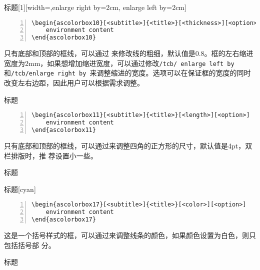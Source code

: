 \begin{ascolorbox10}[子标题]{标题}[1][width=\linewidth-4cm,enlarge right by=2cm, enlarge left by=2cm]
    \zhlipsum[1]
\end{ascolorbox10}
\begin{lstlisting}[backgroundcolor=\color{gray!5},framerule=1pt,frame=tb,numbers=left,
    numberstyle=\tiny\color{black},]
\begin{ascolorbox10}[<subtitle>]{<title>}[<thickness>][<option>]
    environment content
\end{ascolorbox10}
\end{lstlisting}
只有底部和顶部的框线，可以通过\md{[⟨thickness⟩]} 来修改线的粗细，默认值是0.8。框的左右缩进宽度为2mm，如果想增加缩进宽度，可以通过修改\texttt{/tcb/ enlarge left by }和\texttt{/tcb/enlarge
right by }来调整缩进的宽度。选项可以在保证框的宽度的同时改变左右边距，因此用户可以根据需求调整。


\begin{ascolorbox11}[子标题]{标题}
    \zhlipsum[1]
\end{ascolorbox11}
\begin{lstlisting}[backgroundcolor=\color{gray!5},framerule=1pt,frame=tb,numbers=left,
    numberstyle=\tiny\color{black},]
\begin{ascolorbox11}[<subtitle>]{<title>}[<length>][<option>]
    environment content
\end{ascolorbox11}
\end{lstlisting}
只有底部和顶部的框线，可以通过\md{[⟨length⟩]}来调整四角的正方形的尺寸，默认值是4pt，双栏排版时，推
荐设置小一些。
%
\begin{ascolorbox17}[子标题]{标题}
    \zhlipsum[1]
\end{ascolorbox17}

\begin{ascolorbox17}[子标题]{标题}[cyan]
    \zhlipsum[1]
\end{ascolorbox17}
\begin{lstlisting}[backgroundcolor=\color{gray!5},framerule=1pt,frame=tb,numbers=left,
    numberstyle=\tiny\color{black},]
\begin{ascolorbox17}[<subtitle>]{<title>}[<color>][<option>]
    environment content
\end{ascolorbox17}
\end{lstlisting}
这是一个括号样式的框，可以通过\md{[⟨color⟩]}来调整线条的颜色，如果颜色设置为白色，则只包括括号部
分。

\begin{ascolorbox19}[子标题]{标题}
    \zhlipsum[1]
\end{ascolorbox19}

